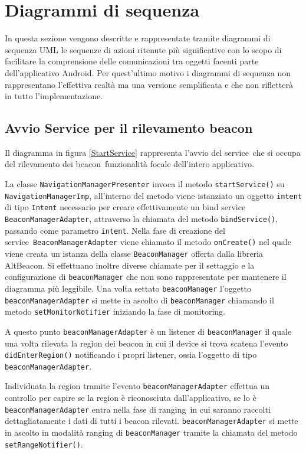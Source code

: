 \documentclass[../DefinizioneDiProdotto.tex]{subfiles}
\begin{document}
\section{Diagrammi di sequenza}

	In questa sezione vengono descritte e rappresentate tramite diagrammi di sequenza UML le sequenze di azioni ritenute più significative con lo scopo di facilitare la comprensione delle comunicazioni tra oggetti facenti parte dell'applicativo Android\g. Per quest'ultimo motivo i diagrammi di sequenza non rappresentano l'effettiva realtà ma una versione semplificata e che non rifletterà in tutto l'implementazione.
	
	\subsection{Avvio Service per il rilevamento beacon}
	
	
		Il diagramma in figura \ref{StartService} rappresenta l'avvio del service\g\ che si occupa del rilevamento dei beacon\g\, funzionalità focale dell'intero applicativo.
		
	La classe \verb|NavigationManagerPresenter| invoca il metodo \verb|startService()| su \verb|NavigationManagerImp|, all'interno del metodo viene istanziato un oggetto \verb|intent| di tipo \verb|Intent| necessario per creare effettivamente un bind service\g\, \verb|BeaconManagerAdapter|, attraverso la chiamata del metodo \verb|bindService()|,  passando come parametro \verb|intent|. 
	Nella fase di creazione del service\g\ \verb|BeaconManagerAdapter| viene chiamato il metodo \verb|onCreate()| nel quale viene creata un istanza della classe \verb|BeaconManager| offerta dalla libreria AltBeacon\g. Si effettuano inoltre diverse chiamate per il settaggio e la configurazione di \verb|beaconManager| che non sono rappresentate per mantenere il diagramma più leggibile. Una volta settato \verb|beaconManager| l'oggetto \verb|beaconManagerAdapter| si mette in ascolto di \verb|beaconManager| chiamando il metodo \verb|setMonitorNotifier| iniziando la fase di monitoring\g.
	
	A questo punto \verb|beaconManagerAdapter| è un listener di \verb|beaconManager| il quale una volta rilevata la region dei beacon in cui il device si trova scatena l'evento \verb|didEnterRegion()| notificando i propri listener, ossia l'oggetto di tipo \verb|beaconManagerAdapter|.
	
	Individuata la region tramite l'evento \verb|beaconManagerAdapter| effettua un controllo per capire se la region è riconosciuta dall'applicativo, se lo è \verb|beaconManagerAdapter| entra nella fase di ranging\g\ in cui saranno raccolti dettagliatamente i dati di tutti i beacon rilevati. \verb|beaconManagerAdapter| si mette in ascolto in modalità ranging di \verb|beaconManager| tramite la chiamata del metodo \verb|setRangeNotifier()|.
	
\end{document}
